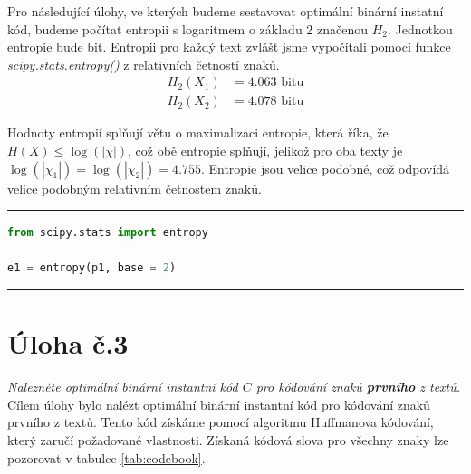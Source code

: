 \documentclass[czech]{mvi-report}
\begin{document}
Pro následující úlohy, ve kterých budeme sestavovat optimální binární instatní kód, budeme počítat entropii s logaritmem o základu 2 značenou $H_2$. Jednotkou entropie bude bit. Entropii pro každý text zvlášť jsme vypočítali pomocí funkce \textit{scipy.stats.entropy()} z relativních četností znaků.
\begin{align*}
  H_2(X_1) &= 4.063 \text{ bitu}\\
  H_2(X_2) &= 4.078 \text{ bitu}
\end{align*}

Hodnoty entropií splňují větu o maximalizaci entropie, která říka, že $H(X) \leq \log(|\chi|)$, což obě entropie splňují, jelikož pro oba texty je $\log(|\chi_1|) = \log(|\chi_2|) = 4.755$. Entropie jsou velice podobné, což odpovídá velice podobným relativním četnostem znaků.

\noindent\rule{\columnwidth}{1pt}
\begin{lstlisting}[language=Python]
from scipy.stats import entropy

e1 = entropy(p1, base = 2)
\end{lstlisting}
\noindent\rule{\columnwidth}{1pt}


\section{Úloha č.3}
\textit{Nalezněte optimální binární instantní kód $C$ pro kódování znaků \textbf{prvního} z textů.}\\

Cílem úlohy bylo nalézt optimální binární instantní kód pro kódování znaků prvního z textů. Tento kód získáme pomocí algoritmu Huffmanova kódování, který zaručí požadované vlastnosti.
Získaná kódová slova pro všechny znaky lze pozorovat v tabulce \ref{tab:codebook}.
\end{document}
